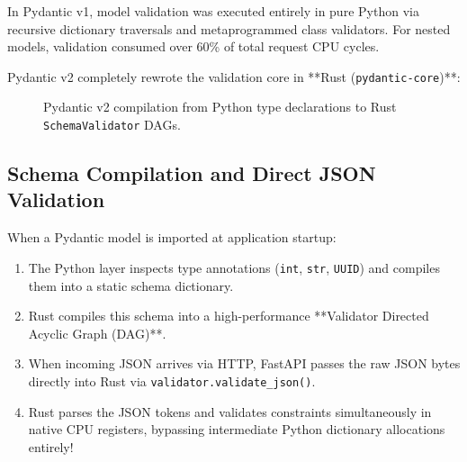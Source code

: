 In Pydantic v1, model validation was executed entirely in pure Python via recursive dictionary traversals and metaprogrammed class validators. For nested models, validation consumed over 60\% of total request CPU cycles.

Pydantic v2 completely rewrote the validation core in **Rust (\texttt{pydantic-core})**:

\begin{figure}[htbp]
\centering
{}
\caption{Pydantic v2 compilation from Python type declarations to Rust \texttt{SchemaValidator} DAGs.}
\label{fig:pydantic-v2}
\end{figure}

\subsection{Schema Compilation and Direct JSON Validation}

When a Pydantic model is imported at application startup:
\begin{enumerate}[leftmargin=15pt]
  \item The Python layer inspects type annotations (\texttt{int}, \texttt{str}, \texttt{UUID}) and compiles them into a static schema dictionary.
  \item Rust compiles this schema into a high-performance **Validator Directed Acyclic Graph (DAG)**.
  \item When incoming JSON arrives via HTTP, FastAPI passes the raw JSON bytes directly into Rust via \texttt{validator.validate\_json()}.
  \item Rust parses the JSON tokens and validates constraints simultaneously in native CPU registers, bypassing intermediate Python dictionary allocations entirely!
\end{enumerate}

